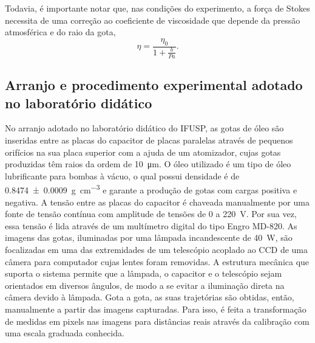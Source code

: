 \documentclass[twoside, twocolumn]{article}
\begin{document}
Todavia, é importante notar que, nas condições do experimento, a força de Stokes necessita de uma correção ao coeficiente de viscosidade que depende da pressão atmosférica e do raio da gota, \cite{apostila}
\begin{equation}\label{eq:etacorr}
	\eta = \frac{\eta_0}{1 + \frac{b}{P a}}\text{.}
\end{equation}

\subsection{Arranjo e procedimento experimental adotado no laboratório didático}

No arranjo adotado no laboratório didático do IFUSP, as gotas de óleo são inseridas entre as placas do capacitor de placas paralelas através de pequenos orifícios na sua placa superior com a ajuda de um atomizador, cujas gotas produzidas têm raios da ordem de \SI{10}{\micro\meter}. O óleo utilizado é um tipo de óleo lubrificante para bombas à vácuo, o qual possui densidade é de \SI{0.8474(9)}{\g\per\cm\cubed} e garante a produção de gotas com cargas positiva e negativa. A tensão entre as placas do capacitor é chaveada manualmente por uma fonte de tensão contínua com amplitude de tensões de \num{0} a \SI{220}{\volt}. Por sua vez, essa tensão é lida através de um multímetro digital do tipo Engro MD-820. As imagens das gotas, iluminadas por uma lâmpada incandescente de \SI{40}{\watt}, são focalizadas em uma das extremidades de um telescópio acoplado ao CCD de uma câmera para computador cujas lentes foram removidas. A estrutura mecânica que suporta o sistema permite que a lâmpada, o capacitor e o telescópio sejam orientados em diversos ângulos, de modo a se evitar a iluminação direta na câmera devido à lâmpada. Gota a gota, as suas trajetórias são obtidas, então, manualmente a partir das imagens capturadas. Para isso, é feita a transformação de medidas em pixels nas imagens para distâncias reais através da calibração com uma escala graduada conhecida.
\end{document}
